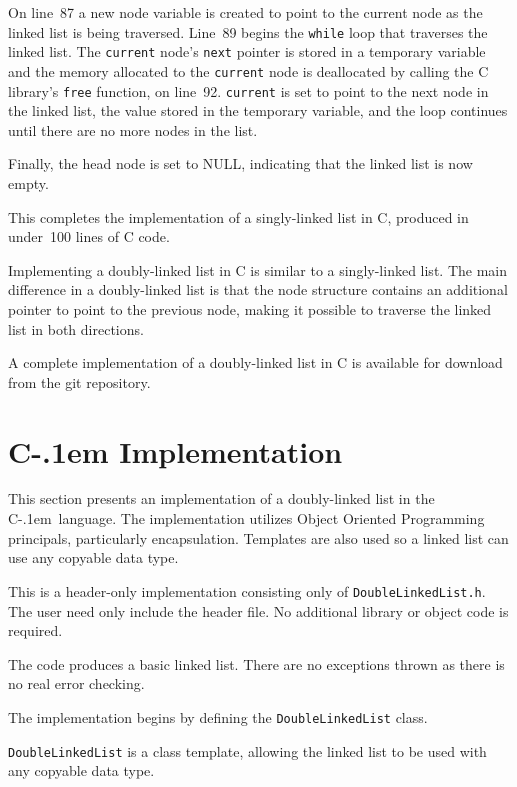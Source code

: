 \documentclass{article}
\newcommand{\Cpp}{\mbox{C\kern-.1em\raisebox{.35ex}{\smaller{\smaller{+\kern-0.05em+}}}}}
\begin{document}
  On line~87 a new node variable is created to point to the current node as the linked list is being traversed. Line~89 begins the \verb|while| loop that traverses the linked list. The \verb|current| node's \verb|next| pointer is stored in a temporary variable and the memory allocated to the \verb|current| node is deallocated by calling the C library's \verb|free| function, on line~92. \verb|current| is set to point to the next node in the linked list, the value stored in the temporary variable, and the loop continues until there are no more nodes in the list.

  Finally, the head node is set to NULL, indicating that the linked list is now empty.

  This completes the implementation of a singly-linked list in C, produced in under~100 lines of C code.

  Implementing a doubly-linked list in C is similar to a singly-linked list. The main difference in a doubly-linked list is that the node structure contains an additional pointer to point to the previous node, making it possible to traverse the linked list in both directions.

  A complete implementation of a doubly-linked list in C is available for download from the git repository.

  \section{\texorpdfstring{\Cpp}{C++} Implementation}
  \label{sect:Cpp_implementation}
  This section presents an implementation of a doubly-linked list in the \Cpp\ language. The implementation utilizes Object Oriented Programming principals, particularly encapsulation. Templates are also used so a linked list can use any copyable data type.

  This is a header-only implementation consisting only of \verb|DoubleLinkedList.h|. The user need only include the header file. No additional library or object code is required.

  The code produces a basic linked list. There are no exceptions thrown as there is no real error checking.

  The implementation begins by defining the \verb|DoubleLinkedList| class.
  \begin{lstcpp}[firstnumber=1]
template<typename T>
class DoubleLinkedList {\end{lstcpp}
  \verb|DoubleLinkedList| is a class template, allowing the linked list to be used with any copyable data type.
\end{document}
